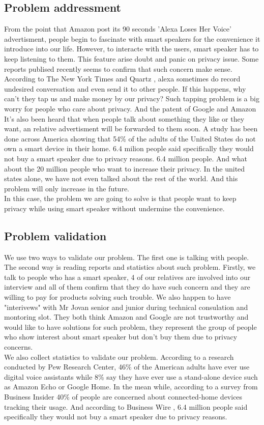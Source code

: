 \documentclass[12pt,twoside]{article}
\begin{document}
\subsection{Problem addressment}
From the point that Amazon post its 90 seconds 'Alexa Loses Her Voice' advertisment, people begin to fascinate with smart speakers 
for the convenience it introduce into our life. However, to interacte with the users, smart speaker has to keep listening to them. 
This feature arise doubt and panic on privacy issue. Some reports publised recently seems to confirm that such concern make sense. 
According to The New York Times \cite{nyctimesalexa} and Quartz \cite{quartzalexa}, alexa sometimes do record undesired conversation and 
even send it to other people. If this happens, why can't they tap us and make money by our privacy? Such tapping problem is a big worry 
for people who care about privacy. And the patent of Google and Amazon It's also been heard that when people talk about something they 
like or they want, an relative advertisment will be forwarded to them soon.
A study has been done across America showing that 54\% of the adults of the United States do not own a smart device in their home. 
6.4 milion people said specifically they would not buy a smart speaker due to privacy reasons. 6.4 million people. And what about 
the 20 million people who want to increase their privacy. In the united states alone, we have not even talked about the rest of the world. 
And this problem will only increase in the future. \\
In this case, the problem we are going to solve is that people want to keep privacy while using smart speaker without undermine the convenience.


\subsection{Problem validation}
We use two ways to validate our problem. The first one is talking with people. The second way is reading reports and statistics about 
such problem. Firstly, we talk to people who has a smart speaker, 4 of our relatives are involved into our interview and all of them 
confirm that they do have such concern and they are willing to pay for products solving such trouble. We also happen to have  
"interivews" with Mr Jovan senior and junior during technical consulation and montoring slot. They both think Amazon and Google are 
not trustworthy and would like to have solutions for such problem, they represent the group of people who show interest about smart 
speaker but don't buy them due to privacy concerns.\\
We also collect statistics to validate our problem. According to a research conducted by Pew Research Center, 46\% of the American adults 
have ever use digital voice assistants while 8\% say they have ever use a stand-alone device such as Amazon Echo or Google Home. 
In the mean while, according to a survey from Business Insider \cite{privacyfear} 40\% of people are concerned about connected-home 
devices tracking their usage. And according to Business Wire , 6.4 million people said specifically they would not buy a smart 
speaker due to privacy reasons.
\end{document}
